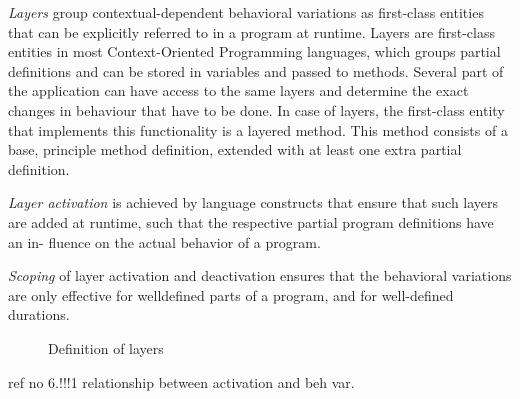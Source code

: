 \documentclass{acm_proc_article-sp}
\begin{document}
\textit{Layers} group contextual-dependent behavioral variations as first-class entities that can be explicitly referred to in a program at runtime. Layers are first-class entities in most Context-Oriented Programming languages, which groups partial definitions and can be stored in variables and passed to methods. Several part of the application can have access to the same layers and determine the exact changes in behaviour that have to be done. In case of layers, the first-class entity that implements this functionality is a layered method. This method consists of a base, principle method definition, extended with at least one extra partial definition.

\textit{Layer activation} is achieved by language constructs that
ensure that such layers are added at runtime, such that
the respective partial program definitions have an in-
fluence on the actual behavior of a program.

\textit{Scoping} of layer activation and deactivation ensures that
the behavioral variations are only effective for welldefined
parts of a program, and for well-defined durations.


\begin{figure}
\centering
{}
\caption{Definition of layers}
\end{figure}

ref no 6.!!!1 relationship between activation and beh var.




\end{document}
